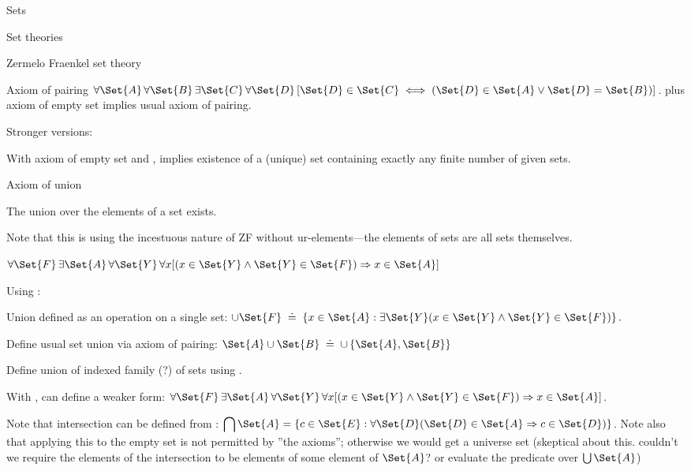 \begin{plSection}{Sets}
\begin{plSection}{Set theories}
\begin{plSection}{Zermelo Fraenkel set theory}
\begin{plSection}{Axiom of pairing}
${\displaystyle 
\forall \Set{A}\,\forall \Set{B}\,
\exists \Set{C}\,
\forall \Set{D}\,[\Set{D}\in \Set{C}
\iff (\Set{D}\in \Set{A}\lor \Set{D}=\Set{B})]}$.
plus 
axiom of empty set
implies usual axiom of pairing.

Stronger versions:

With axiom of empty set\cite{wiki:AxiomOfEmptySet} 
and ,
implies existence of a (unique) set containing exactly
any finite number of given sets.

\end{plSection}%
\begin{plSection}{Axiom of union}
\label{sec:Axiom-of-union}

The union over the elements of a set 
exists\cite{wiki:AxiomOfUnion}.

Note that this is using the incestuous nature of 
\textsf{ZF} without ur-elements---the elements of sets
are all sets themselves. 
 
$\forall {\Set{F}}\,
\exists \Set{A}\,
\forall \Set{Y}\,\forall x
[(x\in \Set{Y} \land \Set{Y}\in \Set{F})
\Rightarrow x\in \Set{A}]$

Using :

Union defined as an operation on a single set:\hfill\break
${\displaystyle 
\cup {\Set{F}} \; \doteq \;
\left\{x\in \Set{A}:\exists \Set{Y} 
(x \in \Set{Y} \land \Set{Y} \in \Set{F})\right\}.}$

Define usual set union via axiom of pairing:
$\Set{A} \cup \Set{B} \; \doteq \; \cup \left\{ \Set{A}, \Set{B}\right\}$

Define union of indexed family (?) of sets
using .

With ,
can define a weaker form:
$\forall {\Set{F}}\,\exists \Set{A}\,\forall \Set{Y}\,
\forall x
[(x\in \Set{Y} 
\land 
\Set{Y}\in {\Set{F}})
\Rightarrow 
x\in \Set{A}]$.

Note that intersection can be defined from 
:\hfill\linebreak
${\displaystyle 
\bigcap \Set{A}=\left\{c\in \Set{E}:
\forall \Set{D} (\Set{D} \in \Set{A} \Rightarrow c\in \Set{D})\right\}}$.
Note also that applying this to the empty set
is not permitted by ''the axioms'';
otherwise we would get a universe set 
(skeptical about this.
couldn't we require the elements of the intersection
to be elements of some element of $\Set{A}$?
or evaluate the predicate over $\bigcup \Set{A}$)


\end{plSection}
\end{plSection}
\end{plSection}
\end{plSection}

